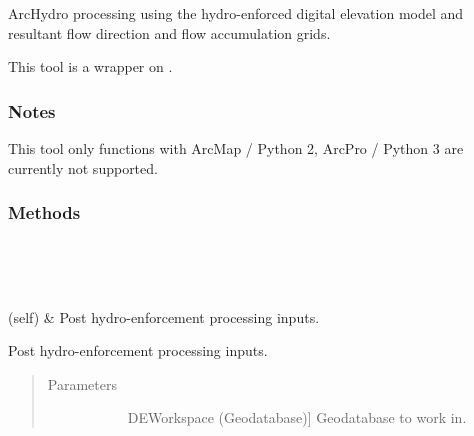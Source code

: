 \documentclass[letterpaper,10pt,english]{sphinxmanual}
\begin{document}
\begin{fulllineitems}
\label{\detokenize{StreamStats_DataPrep:StreamStats_DataPrep.posthydrodem}}
ArcHydro processing using the hydro-enforced digital elevation model and resultant flow direction and flow accumulation grids.

This tool is a wrapper on {\hyperref[\detokenize{make_hydrodem:make_hydrodem.postHydroDEM}]{}}.
\subsubsection*{Notes}

This tool only functions with ArcMap / Python 2, ArcPro / Python 3 are currently not supported.
\subsubsection*{Methods}


\begin{savenotes}\sphinxatlongtablestart\begin{longtable}{}
\hline

\endfirsthead

%
{}\\
\hline

\endhead

\hline
{}\\
\endfoot

\endlastfoot

{\hyperref[\detokenize{StreamStats_DataPrep:StreamStats_DataPrep.posthydrodem.getParameterInfo}]{}}(self)
&
Post hydro-enforcement processing inputs.
\\
\hline
\end{longtable}\sphinxatlongtableend\end{savenotes}

\begin{fulllineitems}
\label{\detokenize{StreamStats_DataPrep:StreamStats_DataPrep.posthydrodem.getParameterInfo}}
Post hydro-enforcement processing inputs.
\begin{quote}\begin{description}
\item[{Parameters}] \leavevmode\begin{description}
\item[{}] \leavevmode{[}DEWorkspace (Geodatabase){]}
Geodatabase to work in.


\end{description}
\end{description}
\end{quote}
\end{fulllineitems}
\end{fulllineitems}
\end{document}
